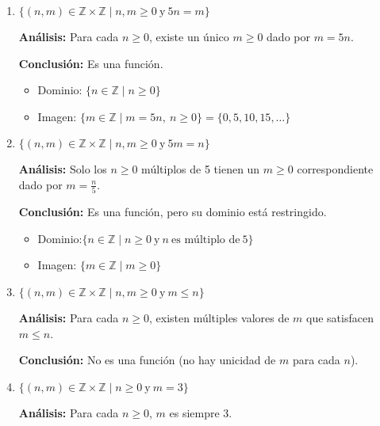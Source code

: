 \begin{solution}
\begin{enumerate}
    \item \(\{(n, m) \in \mathbb{Z} \times \mathbb{Z} \mid n, m \geq 0 \ \text{y} \ 5n = m\}\)

    \textbf{Análisis:} Para cada \( n \geq 0 \), existe un único \( m \geq 0 \) dado por \( m = 5n \).
    
    \textbf{Conclusión:} Es una función.
    
    \begin{itemize}
        \item Dominio: \( \{ n \in \mathbb{Z} \mid n \geq 0 \} \)
        \item Imagen: \( \{ m \in \mathbb{Z} \mid m = 5n, \ n \geq 0 \} = \{0, 5, 10, 15, \dots\} \)
    \end{itemize}
    
    \item \(\{(n, m) \in \mathbb{Z} \times \mathbb{Z} \mid n, m \geq 0 \ \text{y} \ 5m = n\}\)
    
    \textbf{Análisis:} Solo los \( n \geq 0 \) múltiplos de 5 tienen un \( m \geq 0 \) correspondiente dado por \( m = \frac{n}{5} \).
    
    \textbf{Conclusión:} Es una función, pero su dominio está restringido.
    
    \begin{itemize}
        \item Dominio:\( \{ n \in \mathbb{Z} \mid n \geq 0 \ \text{y} \ n \ \text{es múltiplo de} \ 5 \} \)
        \item Imagen: \( \{ m \in \mathbb{Z} \mid m \geq 0 \} \)
    \end{itemize}
    
    \item \(\{(n, m) \in \mathbb{Z} \times \mathbb{Z} \mid n, m \geq 0 \ \text{y} \ m \leq n\}\)

    \textbf{Análisis:} Para cada \( n \geq 0 \), existen múltiples valores de \( m \) que satisfacen \( m \leq n \).
        
    \textbf{Conclusión:} No es una función (no hay unicidad de \( m \) para cada \( n \)).
    
    \item \(\{(n, m) \in \mathbb{Z} \times \mathbb{Z} \mid n \geq 0 \ \text{y} \ m = 3\}\)
    
    \textbf{Análisis:} Para cada \( n \geq 0 \), \( m \) es siempre 3.
    

\end{enumerate}
\end{solution}
